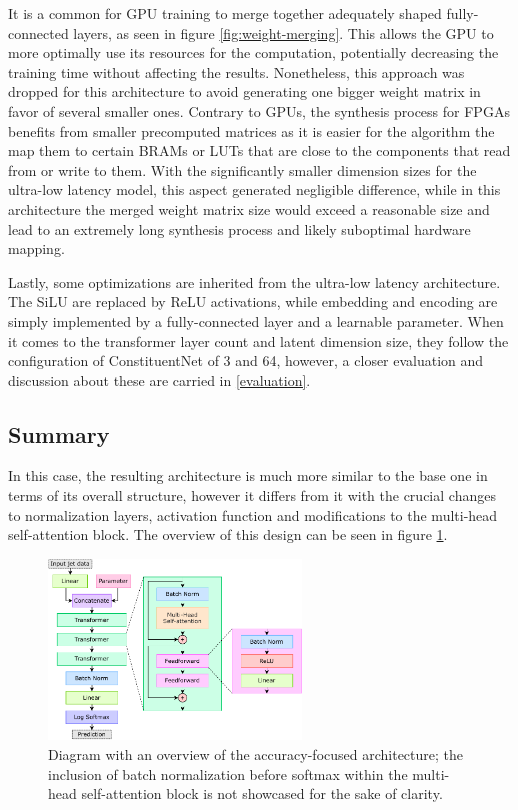 It is a common for GPU training to merge together adequately shaped fully-connected layers, as seen in figure \ref{fig:weight-merging}. This allows the GPU to more optimally use its resources for the computation, potentially decreasing the training time without affecting the results. Nonetheless, this approach was dropped for this architecture to avoid generating one bigger weight matrix in favor of several smaller ones. Contrary to GPUs, the synthesis process for FPGAs benefits from smaller precomputed matrices as it is easier for the algorithm the map them to certain BRAMs or LUTs that are close to the components that read from or write to them. With the significantly smaller dimension sizes for the ultra-low latency model, this aspect generated negligible difference, while in this architecture the merged weight matrix size would exceed a reasonable size and lead to an extremely long synthesis process and likely suboptimal hardware mapping.

Lastly, some optimizations are inherited from the ultra-low latency architecture. The SiLU are replaced by ReLU activations, while embedding and encoding are simply implemented by a fully-connected layer and a learnable parameter. When it comes to the transformer layer count and latent dimension size, they follow the configuration of ConstituentNet of 3 and 64, however, a closer evaluation and discussion about these are carried in \cref{evaluation}.

\subsection{Summary}
In this case, the resulting architecture is much more similar to the base one in terms of its overall structure, however it differs from it with the crucial changes to normalization layers, activation function and modifications to the multi-head self-attention block. The overview of this design can be seen in figure \ref{fig:constituent-net-accuracy}.

\begin{figure}[hpt!]
  \centering
  \includegraphics[trim={0cm 0cm 0cm 0cm}, width=0.6\textwidth, center]{models/constituent_net_accuracy.pdf}
  \caption{Diagram with an overview of the accuracy-focused architecture; the inclusion of batch normalization before softmax within the multi-head self-attention block is not showcased for the sake of clarity.}
  \label{fig:constituent-net-accuracy}
\end{figure}


